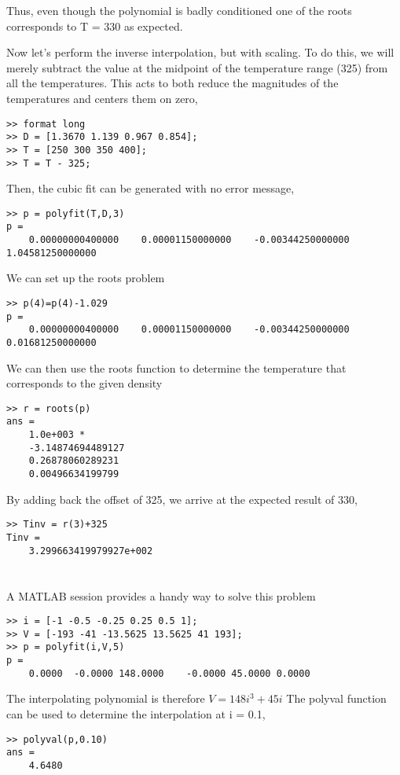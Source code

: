 \documentclass[../main.tex]{subfiles}
\begin{document}
Thus, even though the polynomial is badly conditioned one of the roots corresponds to T =
330 as expected.
	\bigbreak
\begin{blockquote}
Now let’s perform the inverse interpolation, but with scaling. To do this, we will merely
subtract the value at the midpoint of the temperature range (325) from all the temperatures.
This acts to both reduce the magnitudes of the temperatures and centers them on zero,
\end{blockquote}
	\bigbreak
\begin{lstlisting}[numbers=none]
>> format long
>> D = [1.3670 1.139 0.967 0.854];
>> T = [250 300 350 400];
>> T = T - 325; 
\end{lstlisting}
	\bigbreak
Then, the cubic fit can be generated with no error message,
	\bigbreak
\begin{lstlisting}[numbers=none]
>> p = polyfit(T,D,3)
p =
	0.00000000400000	0.00001150000000	-0.00344250000000	1.04581250000000 
\end{lstlisting}
	\bigbreak
We can set up the roots problem
	\bigbreak
\begin{lstlisting}[numbers=none]
>> p(4)=p(4)-1.029
p =
	0.00000000400000	0.00001150000000	-0.00344250000000	0.01681250000000 
\end{lstlisting}
	\bigbreak
We can then use the roots function to determine the temperature that corresponds to the
given density
	\bigbreak
\begin{lstlisting}[numbers=none]
>> r = roots(p)
ans =
	1.0e+003 *
	-3.14874694489127
	0.26878060289231
	0.00496634199799 
\end{lstlisting}
	\bigbreak
By adding back the offset of 325, we arrive at the expected result of 330,
	\bigbreak
\begin{lstlisting}[numbers=none]
>> Tinv = r(3)+325
Tinv =
	3.299663419979927e+002 
\end{lstlisting}



\section{}
A MATLAB session provides a handy way to solve this problem
	\bigbreak
\begin{lstlisting}[numbers=none]
>> i = [-1 -0.5 -0.25 0.25 0.5 1];
>> V = [-193 -41 -13.5625 13.5625 41 193];
>> p = polyfit(i,V,5)
p =
	0.0000	-0.0000	148.0000	-0.0000	45.0000	0.0000 
\end{lstlisting}
	\bigbreak
The interpolating polynomial is therefore
	\bigbreak
$V=148 i^{3}+45 i$
	\bigbreak
The polyval function can be used to determine the interpolation at i = 0.1,
	\bigbreak
\begin{lstlisting}[numbers=none]
>> polyval(p,0.10)
ans =
	4.6480 
\end{lstlisting}
\end{document}
